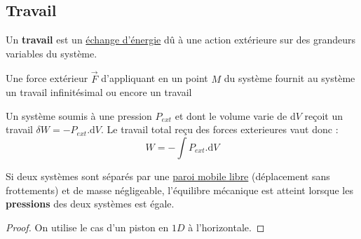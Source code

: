 \documentclass[11pt]{article}
\theoremstyle{cstyle}{\newtheorem{definition}{Définition}[section]}
\theoremstyle{cstyle}{\newtheorem{proposition}[definition]{Propriété}}
\theoremstyle{cstyle}{\newtheorem{theorem}[definition]{Théorème}}
\theoremstyle{mystyle}{\newtheorem{lemma}[definition]{Lemme}}
\theoremstyle{mystyle}{\newtheorem{corollary}[definition]{Corollaire}}
\theoremstyle{mystyle}{\newtheorem*{remark}{Remarque}}
\theoremstyle{mystyle}{\newtheorem*{remarks}{Remarques}}
\theoremstyle{mystyle}{\newtheorem*{example}{Exemple}}
\theoremstyle{mystyle}{\newtheorem*{examples}{Exemples}}
\theoremstyle{definition}{\newtheorem*{exercise}{Exercice}}
\theoremstyle{mystyle}{\newtheorem*{methode}{Méthode}}
\theoremstyle{cstyle}{\newtheorem*{cthm}{}}
\theoremstyle{warn}
\begin{document}
	\begin{minipage}[t]{0.45\textwidth}
		\subsection{Travail}
		
		\begin{definition}[Travail]
			Un \textbf{travail} est un \underline{échange d'énergie} dû à une action extérieure sur des grandeurs variables du système.
		\end{definition}
	
		\begin{proposition}
			Une force extérieur \(\vec{F}\) d'appliquant en un point \(M\) du système fournit au système un travail infinitésimal  ou encore un travail 
		\end{proposition}
	
		\begin{proposition}
			Un système soumis à une pression \(P_{ext}\) et dont le volume varie de d\(V\) reçoit un travail \(\delta W = -P_{ext}.\text{d}V\). Le travail total reçu des forces exterieures vaut donc :
			\[
				W = - \int P_{ext}.\text{d}V 
			\] 
		\end{proposition}
	
		\begin{proposition}
			Si deux systèmes sont séparés par une \underline{paroi mobile libre} (déplacement sans frottements) et de masse négligeable, l'équilibre mécanique est atteint lorsque les \textbf{pressions} des deux systèmes est égale.
		\end{proposition}
	
		\begin{proof}
			On utilise le cas d'un piston en $1D$ à l'horizontale.
		\end{proof}
	
	\end{minipage}
\end{document}
